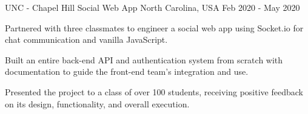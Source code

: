 \begin{cventries}
  \cventry
    {UNC - Chapel Hill} %
    {Social Web App} %
    {North Carolina, USA} %
    {Feb 2020 - May 2020} %
    {
      \begin{cvitems} %
        \item {Partnered with three classmates to engineer a social web app using Socket.io for chat communication and vanilla JavaScript.}
        \item {Built an entire back-end API and authentication system from scratch with documentation to guide the front-end team's integration and use.}
        \item {Presented the project to a class of over 100 students, receiving positive feedback on its design, functionality, and overall execution.}
      \end{cvitems}
    }





\end{cventries}
